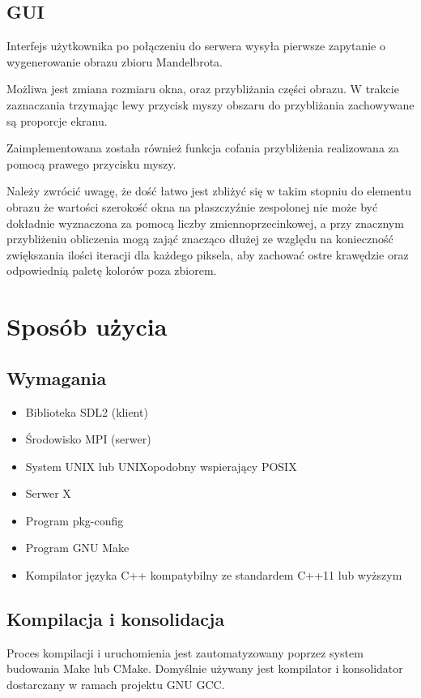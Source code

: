 \subsection{GUI}
Interfejs użytkownika po połączeniu do serwera wysyła pierwsze zapytanie o
wygenerowanie obrazu zbioru Mandelbrota.

Możliwa jest zmiana rozmiaru okna, oraz przybliżania części obrazu. W trakcie
zaznaczania trzymając lewy przycisk myszy obszaru do przybliżania zachowywane są
proporcje ekranu.

Zaimplementowana została również funkcja cofania przybliżenia realizowana za
pomocą prawego przycisku myszy.

Należy zwrócić uwagę, że dość łatwo jest zbliżyć się w takim stopniu do elementu
obrazu że wartości szerokość okna na płaszczyźnie zespolonej nie może być
dokładnie wyznaczona za pomocą liczby zmiennoprzecinkowej, a przy znacznym
przybliżeniu obliczenia mogą zająć znacząco dłużej ze względu na konieczność
zwiększania ilości iteracji dla każdego piksela, aby zachować ostre krawędzie
oraz odpowiednią paletę kolorów poza zbiorem.

\section{Sposób użycia}

\subsection{Wymagania}
\begin{itemize}
    \item Biblioteka SDL2 (klient)
    \item Środowisko MPI (serwer)
    \item System UNIX lub UNIXopodobny wspierający POSIX
    \item Serwer X
    \item Program pkg-config
    \item Program GNU Make
    \item Kompilator języka C++ kompatybilny ze standardem C++11 lub wyższym
\end{itemize}

\subsection{Kompilacja i konsolidacja}
Proces kompilacji i uruchomienia jest zautomatyzowany poprzez system budowania Make lub CMake.
Domyślnie używany jest kompilator i konsolidator dostarczany w ramach projektu GNU GCC.\\

